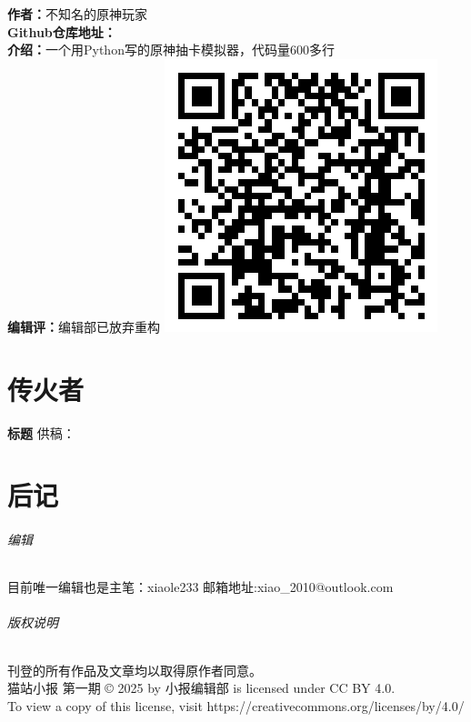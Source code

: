 \documentclass[UTF8,fontset=fandol]{ctexart}
\begin{document}
\noindent
\textbf{作者：}不知名的原神玩家 \\
\textbf{Github仓库地址：} \\
\textbf{介绍：}一个用Python写的原神抽卡模拟器，代码量600多行\\
\textbf{编辑评：}编辑部已放弃重构
\hfill \includegraphics[width=0.08\columnwidth]{assets/02/python-2-qrc.png}

\pagebreak
\part{传火者}
\begin{center}
	\textbf{标题}
	\normalsize
	供稿：
\end{center}


\part{后记}
\paragraph{编辑} 目前唯一编辑也是主笔：xiaole233 邮箱地址:xiao\_2010@outlook.com
\paragraph{版权说明} 刊登的所有作品及文章均以取得原作者同意。\\ 
猫站小报 第一期  © 2025 by 小报编辑部 is licensed under CC BY 4.0.\\ To view a copy of this license, visit https://creativecommons.org/licenses/by/4.0/
\end{document}
